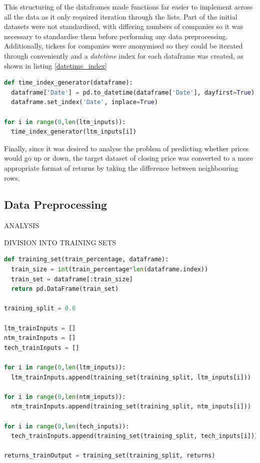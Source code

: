 \documentclass[10pt,onecolumn,letterpaper]{article}
\begin{document}
This structuring of the dataframes made functions far easier to implement across all the data as it only required iteration through the lists. Part of the initial datasets were not standardised, with differing numbers of companies so it was necessary to standardise them before performing any data preprocessing. Additionally, tickers for companies were anonymised so they could be iterated through conveniently and a \textit{datetime} index for each dataframe was created, as shown in listing \ref{datetime_index}

\begin{lstlisting}[language=Python, breaklines=true, label={datetime_index}]
def time_index_generator(dataframe):
  dataframe['Date'] = pd.to_datetime(dataframe['Date'], dayfirst=True)
  dataframe.set_index('Date', inplace=True)

for i in range(0,len(ltm_inputs)):
  time_index_generator(ltm_inputs[i])
\end{lstlisting} 

Finally, since it was desired to analyse the problem of predicting whether prices would go up or down, the target dataset of closing price was converted to a more appropriate format of returns by taking the difference between neighbouring rows. 

\subsection{Data Preprocessing}

ANALYSIS

DIVISION INTO TRAINING SETS
\begin{lstlisting}[language=Python, breaklines=true]
def training_set(train_percentage, dataframe): 
  train_size = int(train_percentage*len(dataframe.index)) 
  train_set = dataframe[:train_size]
  return pd.DataFrame(train_set)  

training_split = 0.6

ltm_trainInputs = []
ntm_trainInputs = []
tech_trainInputs = []

for i in range(0,len(ltm_inputs)):
  ltm_trainInputs.append(training_set(training_split, ltm_inputs[i]))
  
for i in range(0,len(ntm_inputs)):
  ntm_trainInputs.append(training_set(training_split, ntm_inputs[i]))

for i in range(0,len(tech_inputs)):
  tech_trainInputs.append(training_set(training_split, tech_inputs[i]))

returns_trainOutput = training_set(training_split, returns)
\end{lstlisting} 
\end{document}
